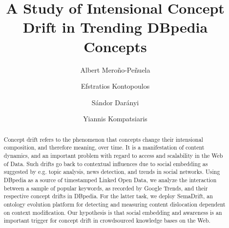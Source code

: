 \documentclass[runningheads,a4paper]{llncs}
\begin{document}
\mainmatter

\title{A Study of Intensional Concept Drift in Trending DBpedia Concepts}
\author{Albert Meroño-Peñuela \and
Efstratios Kontopoulos \and
Sándor Darányi \and
Yiannis Kompatsiaris}
\maketitle

\begin{abstract}
Concept drift refers to the phenomenon that concepts change their intensional composition, and therefore meaning, over time. It is a manifestation of content dynamics, and an important problem with regard to access and scalability in the Web of Data. Such drifts go back to contextual influences due to social embedding as suggested by e.g. topic analysis, news detection, and trends in social networks. Using DBpedia as a source of timestamped Linked Open Data, we analyze the interaction between a sample of popular keywords, as recorded by Google Trends, and their respective concept drifts in DBpedia. For the latter task, we deploy SemaDrift, an ontology evolution platform for detecting and measuring content dislocation dependent on context modification. Our hypothesis is that social embedding and awareness is an important trigger for concept drift in crowdsourced knowledge bases on the Web.

\end{abstract}
\end{document}

